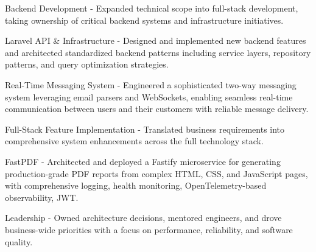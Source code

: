 \begin{cventries}
{\begin{cvsubitems}
        \end{cvsubitems}
        \begin{cvitems} %
            \item {Backend Development - Expanded technical scope into full-stack development, taking ownership of critical backend systems and infrastructure initiatives.}
        \end{cvitems}
        \begin{cvsubitems}
            \item {Laravel API \& Infrastructure - Designed and implemented new backend features and architected standardized backend patterns including service layers, repository patterns, and query optimization strategies.}
            \item {Real-Time Messaging System - Engineered a sophisticated two-way messaging system leveraging email parsers and WebSockets, enabling seamless real-time communication between users and their customers with reliable message delivery.}
            \item {Full-Stack Feature Implementation - Translated business requirements into comprehensive system enhancements across the full technology stack.}
            \item {FastPDF - Architected and deployed a Fastify microservice for generating production-grade PDF reports from complex HTML, CSS, and JavaScript pages, with comprehensive logging, health monitoring, OpenTelemetry-based observability, JWT.}
        \end{cvsubitems}
        \begin{cvitems}
            \item {Leadership - Owned architecture decisions, mentored engineers, and drove business-wide priorities with a focus on performance, reliability, and software quality.}
        \end{cvitems}
    }
\end{cventries}
